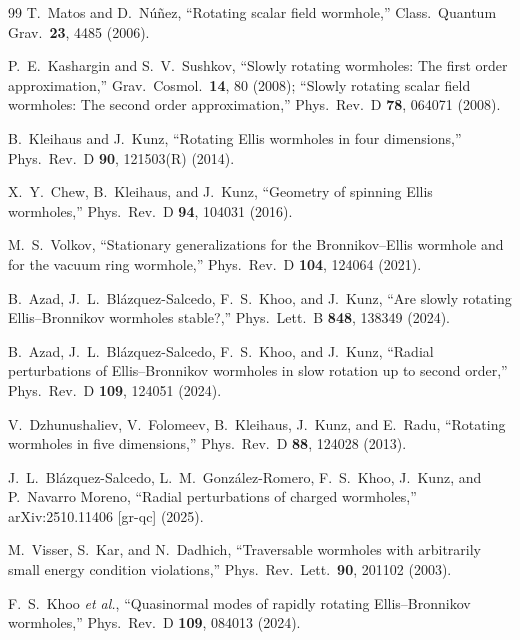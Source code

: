\documentclass[twocolumn,floatfix,aps,prd,superscriptaddress,nofootinbib]{revtex4-2}
\begin{document}
\begin{thebibliography}{99}
T.~Matos and D.~N\'u\~nez,
\newblock ``Rotating scalar field wormhole,''
\newblock Class.\ Quantum Grav.\ \textbf{23}, 4485 (2006).

P.~E.~Kashargin and S.~V.~Sushkov,
\newblock ``Slowly rotating wormholes: The first order approximation,''
\newblock Grav.\ Cosmol.\ \textbf{14}, 80 (2008);
\newblock ``Slowly rotating scalar field wormholes: The second order approximation,''
\newblock Phys.\ Rev.\ D \textbf{78}, 064071 (2008).

B.~Kleihaus and J.~Kunz,
\newblock ``Rotating Ellis wormholes in four dimensions,''
\newblock Phys.\ Rev.\ D \textbf{90}, 121503(R) (2014).

X.~Y.~Chew, B.~Kleihaus, and J.~Kunz,
\newblock ``Geometry of spinning Ellis wormholes,''
\newblock Phys.\ Rev.\ D \textbf{94}, 104031 (2016).

M.~S.~Volkov,
\newblock ``Stationary generalizations for the Bronnikov--Ellis wormhole and for the vacuum ring wormhole,''
\newblock Phys.\ Rev.\ D \textbf{104}, 124064 (2021).

B.~Azad, J.~L.~Bl\'azquez-Salcedo, F.~S.~Khoo, and J.~Kunz,
\newblock ``Are slowly rotating Ellis--Bronnikov wormholes stable?,''
\newblock Phys.\ Lett.\ B \textbf{848}, 138349 (2024).

B.~Azad, J.~L.~Bl\'azquez-Salcedo, F.~S.~Khoo, and J.~Kunz,
\newblock ``Radial perturbations of Ellis--Bronnikov wormholes in slow rotation up to second order,''
\newblock Phys.\ Rev.\ D \textbf{109}, 124051 (2024).

V.~Dzhunushaliev, V.~Folomeev, B.~Kleihaus, J.~Kunz, and E.~Radu,
\newblock ``Rotating wormholes in five dimensions,''
\newblock Phys.\ Rev.\ D \textbf{88}, 124028 (2013).

J.~L.~Bl\'azquez-Salcedo, L.~M.~Gonz\'alez-Romero, F.~S.~Khoo, J.~Kunz, and P.~Navarro Moreno,
\newblock ``Radial perturbations of charged wormholes,''
\newblock arXiv:2510.11406 [gr-qc] (2025).

M.~Visser, S.~Kar, and N.~Dadhich,
\newblock ``Traversable wormholes with arbitrarily small energy condition violations,''
\newblock Phys.\ Rev.\ Lett.\ \textbf{90}, 201102 (2003).

F.~S.~Khoo \emph{et al.},
\newblock ``Quasinormal modes of rapidly rotating Ellis--Bronnikov wormholes,''
\newblock Phys.\ Rev.\ D \textbf{109}, 084013 (2024).


\end{thebibliography}
\end{document}

